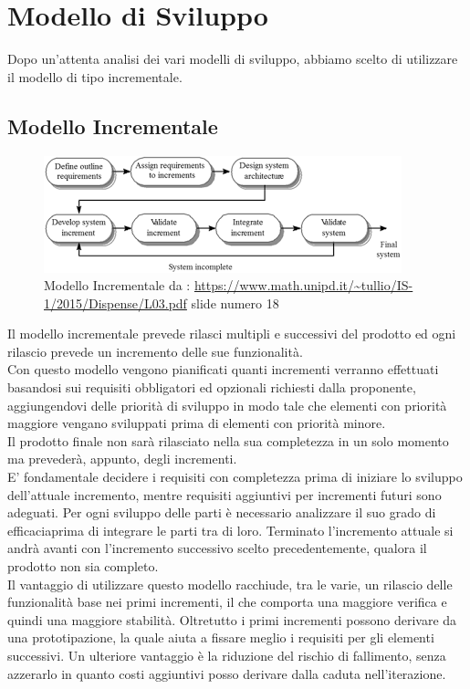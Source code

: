 \section{Modello di Sviluppo}
\label{ModelloSviluppo}

Dopo un'attenta analisi dei vari modelli di sviluppo, abbiamo  scelto di utilizzare il modello di tipo incrementale.

\subsection{Modello Incrementale}

\begin{figure}[h]
	\centering
  		\includegraphics[width=0.7\linewidth]{./images/modelloincrementale.png}
  		\caption{Modello Incrementale da : \url{https://www.math.unipd.it/~tullio/IS-1/2015/Dispense/L03.pdf} slide numero 18}
  		\label{fig:Modello Incrementale}
\end{figure}

Il modello incrementale prevede rilasci multipli e successivi del prodotto ed ogni rilascio prevede un incremento delle sue funzionalità. \\
Con questo modello vengono pianificati quanti incrementi verranno effettuati basandosi sui requisiti obbligatori ed opzionali richiesti dalla proponente, aggiungendovi delle priorità di sviluppo in modo tale che elementi con priorità maggiore vengano sviluppati prima di elementi con priorità minore.\\
Il prodotto finale non sarà rilasciato nella sua completezza in un solo momento ma prevederà, appunto, degli incrementi. \\
E' fondamentale decidere i requisiti con completezza prima di iniziare lo sviluppo dell'attuale incremento, mentre requisiti aggiuntivi per incrementi futuri sono adeguati. Per ogni sviluppo delle parti è necessario analizzare il suo grado di efficacia\glossario prima di integrare le parti tra di loro. Terminato l'incremento attuale si andrà avanti con l'incremento successivo scelto precedentemente, qualora il prodotto non sia completo. \\
Il vantaggio di utilizzare questo modello racchiude, tra le varie, un rilascio delle funzionalità base nei primi incrementi, il che comporta una maggiore verifica e quindi una maggiore stabilità. Oltretutto i primi incrementi possono derivare da una prototipazione, la quale aiuta a fissare meglio i requisiti per gli elementi successivi. Un ulteriore vantaggio è la riduzione del rischio di fallimento, senza azzerarlo in quanto costi aggiuntivi posso derivare dalla caduta nell'iterazione\glossario.

